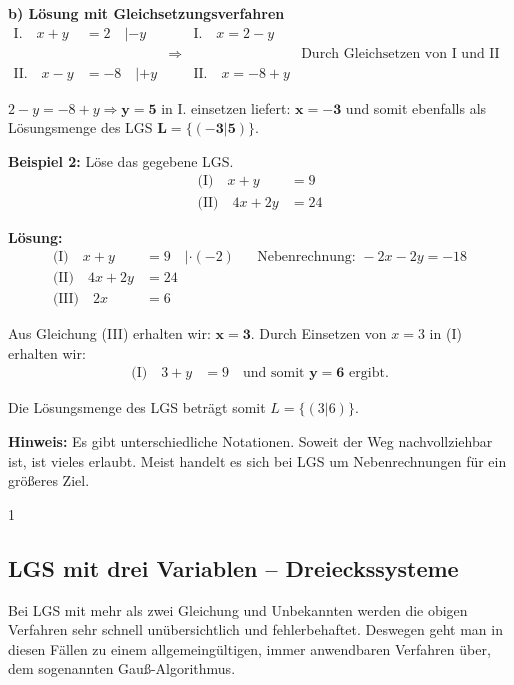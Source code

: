 \documentclass{article}
\begin{document}
\textbf{b) Lösung mit Gleichsetzungsverfahren}
\begin{align*}
\text{I.} \quad x + y &= 2 \quad |- y && \text{I.} \quad x = 2 - y\\
&&\Rightarrow && \text{Durch Gleichsetzen von I und II folgt}\\
\text{II.} \quad x - y &= -8 \quad |+ y && \text{II.} \quad x = -8 + y
\end{align*}

$2 - y = -8 + y \Rightarrow \mathbf{y = 5}$ in I. einsetzen liefert: $\mathbf{x = -3}$ und somit ebenfalls als Lösungsmenge des LGS $\mathbf{L = \{(-3|5)\}}$.

\textbf{Beispiel 2:} Löse das gegebene LGS.
\begin{align*}
\text{(I)} \quad x + y &= 9\\
\text{(II)} \quad 4x + 2y &= 24
\end{align*}

\textbf{Lösung:}
\begin{align*}
\text{(I)} \quad x + y &= 9 \quad |\cdot (-2) && \text{Nebenrechnung: } -2x - 2y = -18\\
\text{(II)} \quad 4x + 2y &= 24\\
\text{(III)} \quad 2x &= 6
\end{align*}

Aus Gleichung (III) erhalten wir: $\mathbf{x = 3}$. Durch Einsetzen von $x = 3$ in (I) erhalten wir:
\begin{align*}
\text{(I)} \quad 3 + y &= 9 \quad \text{und somit } \mathbf{y = 6} \text{ ergibt.}
\end{align*}

Die Lösungsmenge des LGS beträgt somit $L = \{(3|6)\}$.

\textbf{Hinweis:} Es gibt unterschiedliche Notationen. Soweit der Weg nachvollziehbar ist, ist vieles erlaubt. Meist handelt es sich bei LGS um Nebenrechnungen für ein größeres Ziel.

\hfill 1

\newpage

\subsection{LGS mit drei Variablen – Dreieckssysteme}

Bei LGS mit mehr als zwei Gleichung und Unbekannten werden die obigen Verfahren sehr schnell unübersichtlich und fehlerbehaftet. Deswegen geht man in diesen Fällen zu einem allgemeingültigen, immer anwendbaren Verfahren über, dem sogenannten Gauß-Algorithmus.
\end{document}

